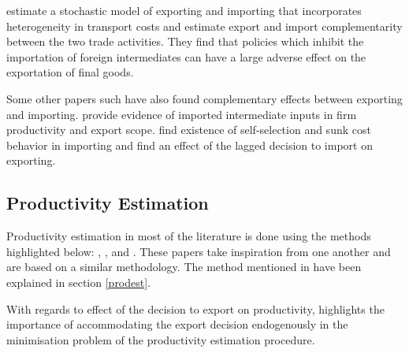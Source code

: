 \documentclass[12pt]{article}
\begin{document}
\textcite{kasahara2013productivity} estimate a stochastic model of
exporting and importing that incorporates heterogeneity in transport
costs and estimate export and import complementarity between the two
trade activities. They find that policies which inhibit the
importation of  foreign intermediates can have a large adverse 
effect on the exportation of final goods.  

Some other papers such have also found complementary effects between
exporting and importing. \textcite{vogel2010higher} provide evidence of imported
intermediate inputs in firm productivity and export scope. 
 \textcite{muuls2009imports} find
existence of self-selection and sunk cost behavior in importing and
find an effect of the lagged decision to import on exporting. 
\subsection*{Productivity Estimation}
Productivity estimation in most of the literature is done using
the methods highlighted below:
\textcite{olley1992dynamics}, \textcite{levinsohn2003estimating},
\textcite{ackerberg2006structural} and \textcite{wooldridge2009estimating}. 
These papers take inspiration from one another and are based on a
similar methodology. The method
mentioned in \textcite{olley1992dynamics}
have been explained in section \ref{prodest}.

With regards to effect of the decision to export on productivity, \textcite{de2013detecting} highlights the importance of accommodating
the export decision endogenously in the minimisation problem of the productivity
estimation procedure. 
\end{document}
